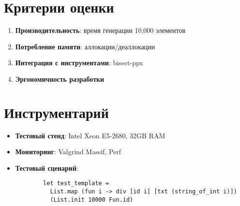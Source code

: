 \section{Критерии оценки}
\begin{enumerate}
    \item \textbf{Производительность}: время генерации 10,000 элементов
    \item \textbf{Потребление памяти}: аллокации/деаллокации
    \item \textbf{Интеграция с инструментами}: bisect-ppx
    \item \textbf{Эргономичность разработки}
\end{enumerate}

\section{Инструментарий}
\begin{itemize}
    \item \textbf{Тестовый стенд}: Intel Xeon E5-2680, 32GB RAM
    \item \textbf{Мониторинг}: Valgrind Massif, Perf
    \item \textbf{Тестовый сценарий}: 
        \begin{lstlisting}
        let test_template = 
          List.map (fun i -> div [id i] [txt (string_of_int i)]) 
          (List.init 10000 Fun.id)
        \end{lstlisting}
\end{itemize}